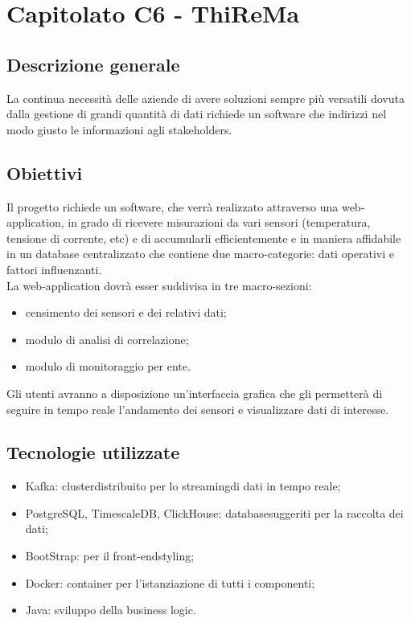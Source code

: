 \section{Capitolato C6 - ThiReMa}

\subsection{Descrizione generale}
La continua necessità delle aziende di avere soluzioni sempre più versatili dovuta dalla gestione di grandi quantità di dati richiede un software che indirizzi nel modo giusto le informazioni agli stakeholders.   

\subsection{Obiettivi}
Il progetto richiede un software, che verrà realizzato attraverso una web-application, in grado di ricevere misurazioni da vari sensori (temperatura, tensione di corrente, etc) e di accumularli efficientemente e in maniera affidabile in un database centralizzato che contiene due macro-categorie: dati operativi e fattori influenzanti. \\
La web-application dovrà esser suddivisa in tre macro-sezioni:
\begin{itemize}
\item censimento dei sensori e dei relativi dati;
\item modulo di analisi di correlazione;
\item modulo di monitoraggio per ente.
\end{itemize}
Gli utenti avranno a disposizione un’interfaccia grafica che gli permetterà di seguire in tempo reale l’andamento dei sensori e visualizzare dati di interesse.

\subsection{Tecnologie utilizzate}
\begin{itemize}
\item Kafka: cluster\glo distribuito per lo streaming\glo di dati in tempo reale;
\item PostgreSQL, TimescaleDB, ClickHouse: database\glo suggeriti per la raccolta dei dati;
\item BootStrap: per il front-end\glo styling;
\item Docker: container per l’istanziazione di tutti i componenti;
\item Java: sviluppo della business logic\glo.
\end{itemize}

